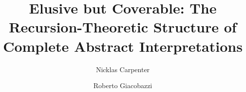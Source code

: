 \documentclass[runningheads]{llncs}
\newif\ifanonymous
\begin{document}
\title{Elusive but Coverable: The Recursion-Theoretic Structure of Complete Abstract Interpretations
}

\ifanonymous
  \author{Anonymous Authors}
  \authorrunning{Anonymous Authors}
  \institute{Anonymous Institution}
\else
  \author{Nicklas Carpenter \and Roberto Giacobazzi}
  \authorrunning{}
\fi 

\maketitle
\end{document}
